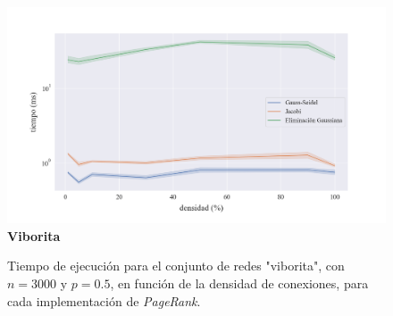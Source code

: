 \begin{figure}[!htbp]
    \centering
    \includegraphics[width=1\textwidth, trim=0 0 0 30]{files/src/.media/densidad_viborita.png}
    \textbf{Viborita}\par
    \caption{Tiempo de ejecución para el conjunto de redes "viborita", con $n = 3000$ y $p = 0.5$, en función de la densidad de conexiones, para cada implementación de \textit{PageRank}.}
    \label{densidad_viborita}
\end{figure}

